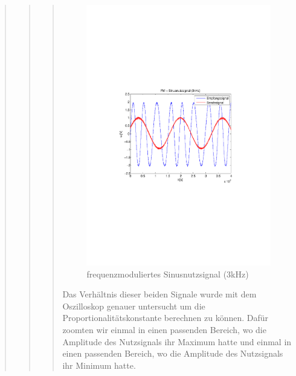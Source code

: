\begin{quote}
\begin{quote}
\begin{quote}
\begin{figure}[H]
                    \includegraphics[scale=0.5, trim = 3cm 8.5cm 3.5cm 8.5cm,
                    clip]{./Bilder/fm_sinus(3kHz)}
                        \caption{frequenzmoduliertes Sinusnutzsignal (3kHz)}
                \end{figure}
        
        Das Verhältnis dieser beiden Signale wurde mit dem Oszilloskop genauer
        untersucht um die Proportionalitätskonstante berechnen zu können. Dafür
        zoomten wir einmal in einen passenden Bereich, wo die Amplitude des
        Nutzsignals ihr Maximum hatte und einmal in einen passenden Bereich, wo die
        Amplitude des Nutzsignals ihr Minimum hatte.
        

\end{quote}
\end{quote}
\end{quote}
